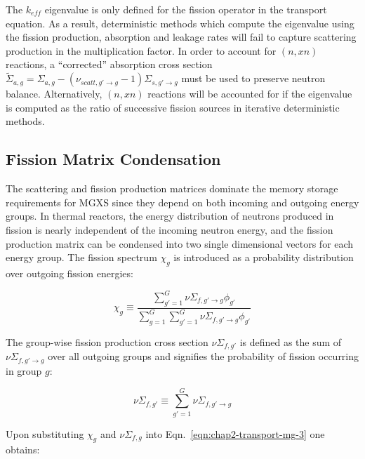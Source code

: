 The $k_{eff}$ eigenvalue is only defined for the fission operator in the transport equation. As a result, deterministic methods which compute the eigenvalue using the fission production, absorption and leakage rates will fail to capture scattering production in the multiplication factor. In order to account for $(n,xn)$ reactions, a ``corrected'' absorption cross section $\tilde{\Sigma}_{a,g} = \Sigma_{a,g} - (\nu_{scatt,g' \rightarrow g} - 1)\Sigma_{s,g' \rightarrow g}$ must be used to preserve neutron balance. Alternatively, $(n,xn)$ reactions will be accounted for if the eigenvalue is computed as the ratio of successive fission sources in iterative deterministic methods.


\subsection{Fission Matrix Condensation}
\label{sec:chap2-fiss-mat}

The scattering and fission production matrices dominate the memory storage requirements for \ac{MGXS} since they depend on both incoming and outgoing energy groups. In thermal reactors, the energy distribution of neutrons produced in fission is nearly independent of the incoming neutron energy, and the fission production matrix can be condensed into two single dimensional vectors for each energy group. The fission spectrum $\chi_{g}$ is introduced as a probability distribution over outgoing fission energies:

\begin{dmath}
\label{eqn:chap2-chi}
\chi_{g} \equiv \frac{\displaystyle\sum\limits_{g'=1}^{G}\nu\Sigma_{f,g'\rightarrow g}\phi_{g'}}{\displaystyle\sum\limits_{g=1}^{G}\displaystyle\sum\limits_{g'=1}^{G}\nu\Sigma_{f,g'\rightarrow g}\phi_{g'}}
\end{dmath}

The group-wise fission production cross section $\nu\Sigma_{f,g'}$ is defined as the sum of $\nu\Sigma_{f,g'\rightarrow g}$ over all outgoing groups and signifies the probability of fission occurring in group $g$:

\begin{dmath}
\label{eqn:chap2-nusifg}
\nu\Sigma_{f,g'} \equiv \displaystyle\sum\limits_{g'=1}^{G}\nu\Sigma_{f,g'\rightarrow g}
\end{dmath}

\noindent Upon substituting $\chi_{g}$ and $\nu\Sigma_{f,g}$ into Eqn.~\ref{eqn:chap2-transport-mg-3} one obtains:

